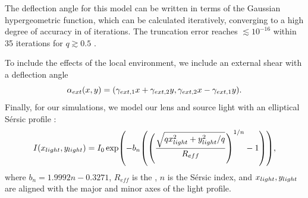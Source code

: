 The deflection angle for this model can be written in terms of the Gaussian hypergeometric function, which can be calculated iteratively, converging to a high degree of accuracy in  of iterations. The truncation error reaches $\lesssim 10^{-16}$ within 35 iterations for $q \gtrsim 0.5$ \citep{tessore2015a}. 



To include the effects of the local environment, we include an external shear with a deflection angle
\begin{equation}
    \alpha_{ext}(x,y) = \qty(\gamma_{ext,1} x + \gamma_{ext,2} y, \gamma_{ext,2} x - \gamma_{ext,1} y).
\end{equation}
Finally, for our simulations, we model our lens and source light with an elliptical S\'ersic profile \citep{sersic1963}:
\begin{equation}
    I(x_{\agu{light}},y_{\agu{light}}) = I_0 \exp(-b_n \qty(\qty(\frac{\sqrt{qx_{\agu{light}}^2 + y_{\agu{light}}^2/q}}{R_{eff}})^{1/n} - 1)),
\end{equation}
where $b_n=1.9992n - 0.3271$, $R_{eff}$ is the , $n$ is the S\'ersic index, and $x_{\textcolor{black}{light}},y_{\textcolor{black}{light}}$ are 
aligned with the major and minor axes of the light profile.  

